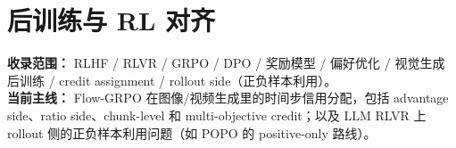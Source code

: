
\section*{后训练与 RL 对齐}
{}

\begin{conceptbox}
\textbf{收录范围：} RLHF / RLVR / GRPO / DPO / 奖励模型 / 偏好优化 / 视觉生成后训练 / credit assignment / rollout side（正负样本利用）。\\
\textbf{当前主线：} Flow-GRPO 在图像/视频生成里的时间步信用分配，包括 advantage side、ratio side、chunk-level 和 multi-objective credit；以及 LLM RLVR 上 rollout 侧的正负样本利用问题（如 POPO 的 positive-only 路线）。
\end{conceptbox}
















